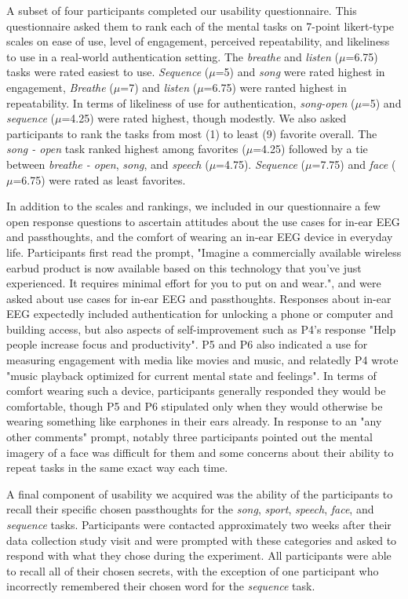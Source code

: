 \documentclass{sigchi}
\begin{document}
A subset of four participants completed our usability questionnaire. This questionnaire asked them to rank each of the mental tasks on 7-point likert-type scales on ease of use, level of engagement, perceived repeatability, and likeliness to use in a real-world authentication setting. The \textit{breathe} and \textit{listen} (\(\mu\)=6.75) tasks were rated easiest to use. \textit{Sequence} (\(\mu\)=5) and \textit{song} were rated highest in engagement, \textit{Breathe} (\(\mu\)=7) and \textit{listen} (\(\mu\)=6.75) were ranted highest in repeatability. In terms of likeliness of use for authentication, \textit{song-open} (\(\mu\)=5) and \textit{sequence} (\(\mu\)=4.25) were rated highest, though modestly. We also asked participants to rank the tasks from most (1) to least (9) favorite overall. The \textit{song - open} task ranked highest among favorites (\(\mu\)=4.25) followed by a tie between \textit{breathe - open}, \textit{song}, and \textit{speech} (\(\mu\)=4.75). \textit{Sequence} (\(\mu\)=7.75) and \textit{face} (\(\mu\)=6.75) were rated as least favorites.

In addition to the scales and rankings, we included in our questionnaire a few open response questions to ascertain attitudes about the use cases for in-ear EEG and passthoughts, and the comfort of wearing an in-ear EEG device in everyday life. Participants first read the prompt, "Imagine a commercially available wireless earbud product is now available based on this technology that you've just experienced. It requires minimal effort for you to put on and wear.", and were asked about use cases for in-ear EEG and passthoughts. Responses about in-ear EEG expectedly included authentication for unlocking a phone or computer and building access, but also aspects of self-improvement such as P4's response "Help people increase focus and productivity". P5 and P6 also indicated a use for measuring engagement with media like movies and music, and relatedly P4 wrote "music playback optimized for current mental state and feelings". In terms of comfort wearing such a device, participants generally responded they would be comfortable, though P5 and P6 stipulated only when they would otherwise be wearing something like earphones in their ears already. In response to an "any other comments" prompt, notably three participants pointed out the mental imagery of a face was difficult for them and some concerns about their ability to repeat tasks in the same exact way each time.

A final component of usability we acquired was the ability of the participants to recall their specific chosen passthoughts for the \textit{song}, \textit{sport}, \textit{speech}, \textit{face}, and \textit{sequence} tasks. Participants were contacted approximately two weeks after their data collection study visit and were prompted with these categories and asked to respond with what they chose during the experiment. All participants were able to recall all of their chosen secrets, with the exception of one participant who incorrectly remembered their chosen word for the \textit{sequence} task. 
\end{document}
